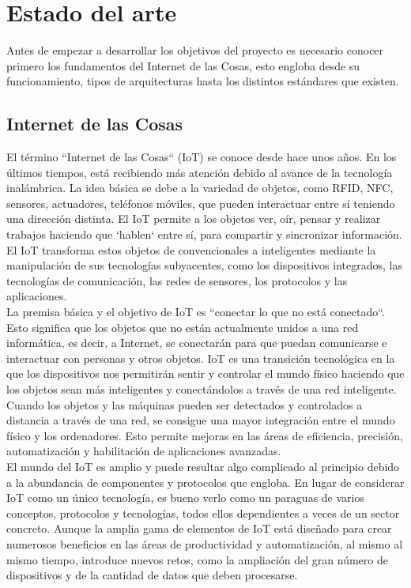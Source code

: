 \chapter{Estado del arte}

{\color{blue}

Antes de empezar a desarrollar los objetivos del proyecto es necesario conocer primero los fundamentos del Internet de las Cosas, esto engloba desde su funcionamiento, tipos de arquitecturas hasta los distintos estándares que existen.

\section{Internet de las Cosas}

El término ``Internet de las Cosas`` (IoT) se conoce desde hace unos años. En los últimos tiempos, está recibiendo más atención debido al avance de la tecnología inalámbrica. La idea básica se debe a la variedad de objetos, como RFID, NFC, sensores, actuadores, teléfonos móviles, que pueden interactuar entre sí teniendo una dirección distinta. El IoT permite a los objetos ver, oír, pensar y realizar trabajos haciendo que `hablen` entre sí, para compartir y sincronizar información. El IoT transforma estos objetos de convencionales a inteligentes mediante la manipulación de sus tecnologías subyacentes, como los dispositivos integrados, las tecnologías de comunicación, las redes de sensores, los protocolos y las aplicaciones. \cite{7589556} \\

La premisa básica y el objetivo de IoT es ``conectar lo que no está conectado``. Esto significa que los objetos que no están actualmente unidos a una red informática, es decir, a Internet, se conectarán para que puedan comunicarse e interactuar con personas y otros objetos. IoT es una transición tecnológica en la que los dispositivos nos permitirán sentir y controlar el mundo físico haciendo que los objetos sean más inteligentes y conectándolos a través de una red inteligente. Cuando los objetos y las máquinas pueden ser detectados y controlados a distancia a través de una red, se consigue una mayor integración entre el mundo físico y los ordenadores. Esto permite mejoras en las áreas de eficiencia, precisión, automatización y habilitación de aplicaciones avanzadas. \\

El mundo del IoT es amplio y puede resultar algo complicado al principio debido a la abundancia de componentes y protocolos que engloba. En lugar de considerar IoT como un único tecnología, es bueno verlo como un paraguas de varios conceptos, protocolos y tecnologías, todos ellos dependientes a veces de un sector concreto. Aunque la amplia gama de elementos de IoT está diseñado para crear numerosos beneficios en las áreas de productividad y automatización, al mismo al mismo tiempo, introduce nuevos retos, como la ampliación del gran número de dispositivos y de la cantidad de datos que deben procesarse. \cite{hanes2017iot}

}
